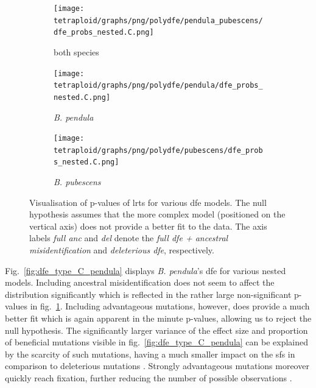\documentclass[hidelinks,11pt]{article}
\newcommand{\pendula}{\textit{B. pendula}}
\newcommand{\pubescens}{\textit{B. pubescens}}
\begin{document}
    \begin{figure}[ht]
        \centering
        \begin{subfigure}[b]{0.32\textwidth}
            \centering
            \texttt{[image: tetraploid/graphs/png/polydfe/pendula\_pubescens/dfe\_probs\_nested.C.png]}
            \caption{both species}
            \label{fig:probs_nested_pendula_pubescens}
        \end{subfigure}
        \hfill
        \begin{subfigure}[b]{0.32\textwidth}
            \centering
            \texttt{[image: tetraploid/graphs/png/polydfe/pendula/dfe\_probs\_nested.C.png]}
            \caption{\pendula{}}
            \label{fig:probs_nested_pendula}
        \end{subfigure}
        \hfill
        \begin{subfigure}[b]{0.32\textwidth}
            \centering
            \texttt{[image: tetraploid/graphs/png/polydfe/pubescens/dfe\_probs\_nested.C.png]}
            \caption{\pubescens{}}
            \label{fig:probs_nested_pubescens}
        \end{subfigure}
        \caption{Visualisation of p-values of \acrshort{lrt}s for various \acrshort{dfe} models. The null hypothesis assumes that the more complex model (positioned on the vertical axis) does not provide a better fit to the data. The axis labels \textit{full anc} and \textit{del} denote the \textit{full \acrshort{dfe} + ancestral misidentification} and \textit{deleterious \acrshort{dfe}}, respectively.}
        \label{fig:probs_nested}
    \end{figure}

    Fig.~\ref{fig:dfe_type_C_pendula} displays \pendula{}'s \acrshort{dfe} for various nested models. Including ancestral misidentification does not seem to affect the distribution significantly which is reflected in the rather large non-significant p-values in fig.~\ref{fig:probs_nested_pendula_pubescens}. Including advantageous mutations, however, does provide a much better fit which is again apparent in the minute p-values, allowing us to reject the null hypothesis. The significantly larger variance of the effect size and proportion of beneficial mutations visible in fig.~\ref{fig:dfe_type_C_pendula} can be explained by the scarcity of such mutations, having a much smaller impact on the \acrshort{sfs} in comparison to deleterious mutations \cite{dfe-plants}. Strongly advantageous mutations moreover quickly reach fixation, further reducing the number of possible observations \cite{polydfe}.
\end{document}
